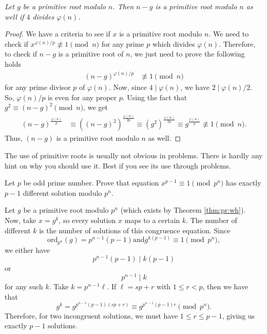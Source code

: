 \documentclass{subfile}
\begin{document}
	\begin{theorem}\slshape
		Let $g$ be a primitive root modulo $n$. Then $n-g$ is a primitive root modulo $n$ as well if $4$ divides $\varphi(n)$.
	\end{theorem}
	
	\begin{proof}
		We have a criteria to see if $x$ is a primitive root modulo $n$. We need to check if $x^{{\varphi(n)}/{p}}\not\equiv1\pmod n$ for any prime $p$ which divides $\varphi(n)$. Therefore, to check if $n-g$ is a primitive root of $n$, we just need to prove the following holds
		\begin{align*}
		(n-g)^{{\varphi(n)}/{p}} & \not\equiv1\pmod n
		\end{align*}
		for any prime divisor $p$ of $\varphi(n)$. Now, since $4 \mid \varphi(n)$, we have $2 \mid {\varphi(n)}/{2}$. So, ${\varphi(n)}/{p}$ is even for any proper $p$. Using the fact that $g^2\equiv(n-g)^2\pmod n$, we get
		\begin{align*}
		(n-g)^\frac{\varphi(n)}{p}   & \equiv\left((n-g)^2\right)^{\frac{\varphi(n)}{2p}} \equiv \left(g^2\right)^{\frac{\varphi(n)}{2p}}  \equiv g^{\frac{\varphi(n)}{p}} \not\equiv1\pmod n.
		\end{align*} 
		Thus, $(n-g)$ is a primitive root modulo $n$ as well.
	\end{proof}
The use of primitive roots is usually not obvious in problems. There is hardly any hint on why you should use it. Best if you see its use through problems.
	\begin{problem}
		Let $p$ be odd prime number. Prove that equation  $x^{p-1}\equiv 1 \pmod{p^n}$ has exactly $p -1$ different solution modulo $p^{n}$.
	\end{problem}
	
	\begin{solution}[1]
		Let $g$ be a primitive root modulo $p^n$ (which exists by Theorem \ref{thm:pr:wh}). Now, take $x=g^k$, so every solution $x$ maps to a certain $k$. The number of different $k$ is the number of solutions of this congruence equation. Since $$\text{ord}_{p^n}(g)=p^{n-1}(p-1) \text{and} g^{k(p-1)}\equiv1\pmod{p^n},$$  we either have $$p^{n-1}(p-1) \mid k(p-1)$$ or $$p^{n-1} \mid k$$ for any such $k$. Take $k=p^{n-1}\ell$. If $\ell=sp+r$ with $1\leq r<p$, then we have that $$g^k=g^{p^{n-1}(p-1)(sp+r)}\equiv g^{p^{n-1}(p-1)r}\pmod{p^n}.$$ Therefore, for two incongruent solutions, we must have $1\leq r\leq p-1$, giving us exactly $p-1$ solutions.
	\end{solution}
	
\end{document}
